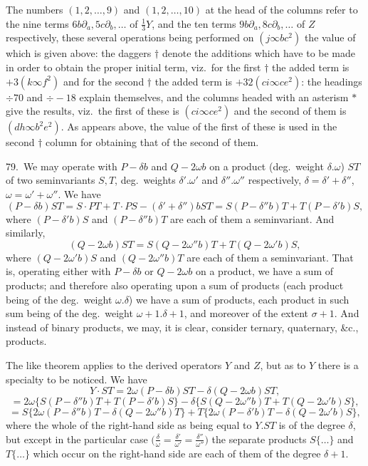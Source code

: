 \documentclass[11pt]{article}
\begin{document}
\clearpage
The numbers $(1, 2, \ldots, 9)$ and $(1, 2, \ldots, 10)$ at the head of the columns refer to the nine terms $6b\partial_a, 5c\partial_b, \ldots$ of $\tfrac{1}{3} Y$, and the ten terms $9b\partial_a, 8c\partial_b, \ldots$ of $Z$ respectively, these several operations being performed on $(j \infty bc^2)$ the value of which is given above: the daggers $\dagger$ denote the additions which have to be made in order to obtain the proper initial term, viz.\ for the first $\dagger$ the added term is $+ 3(k \infty f^2)$ and for the second $\dagger$ the added term is $+ 32(ci \infty ce^2)$: the headings $\div 70$ and $\div -18$ explain themselves, and the columns headed with an asterism $*$ give the results, viz.\ the first of these is $(ci \infty ce^2)$ and the second of them is $(dh \infty b^2e^2)$. As appears above, the value of the first of these is used in the second $\dagger$ column for obtaining that of the second of them.

79.\ We may operate with $P - \delta b$ and $Q - 2\omega b$ on a product (deg.\ weight $\delta . \omega$) $ST$ of two seminvariants $S, T$, deg.\ weights $\delta' . \omega'$ and $\delta'' . \omega''$ respectively, $\delta = \delta' + \delta''$, $\omega = \omega' + \omega''$. We have
\[
(P - \delta b)ST = S \cdot PT + T \cdot PS - (\delta' + \delta'')bST = S(P - \delta''b)T + T(P - \delta'b)S,
\]
where $(P - \delta'b)S$ and $(P - \delta''b)T$ are each of them a seminvariant. And similarly,
\[
(Q - 2\omega b)ST = S(Q - 2\omega''b)T + T(Q - 2\omega'b)S,
\]
where $(Q - 2\omega'b)S$ and $(Q - 2\omega''b)T$ are each of them a seminvariant. That is, operating either with $P - \delta b$ or $Q - 2\omega b$ on a product, we have a sum of products; and therefore also operating upon a sum of products (each product being of the deg.\ weight $\omega . \delta$) we have a sum of products, each product in such sum being of the deg.\ weight $\omega + 1 . \delta + 1$, and moreover of the extent $\sigma + 1$. And instead of binary products, we may, it is clear, consider ternary, quaternary, \&c., products.

The like theorem applies to the derived operators $Y$ and $Z$, but as to $Y$ there is a specialty to be noticed. We have
\[
Y \cdot ST = 2\omega (P - \delta b)ST - \delta (Q - 2\omega b)ST,
\]
\[
= 2\omega \{S(P - \delta''b)T + T(P - \delta'b)S\} - \delta \{S(Q - 2\omega''b)T + T(Q - 2\omega'b)S\},
\]
\[
= S\{2\omega (P - \delta''b)T - \delta (Q - 2\omega''b)T\} + T\{2\omega (P - \delta'b)T - \delta (Q - 2\omega'b)S\},
\]
where the whole of the right-hand side as being equal to $Y . ST$ is of the degree $\delta$, but except in the particular case $\bigl(\frac{\delta}{\omega} = \frac{\delta'}{\omega'} = \frac{\delta''}{\omega''}\bigr)$ the separate products $S\{\ldots\}$ and $T\{\ldots\}$ which occur on the right-hand side are each of them of the degree $\delta + 1$.
\end{document}
